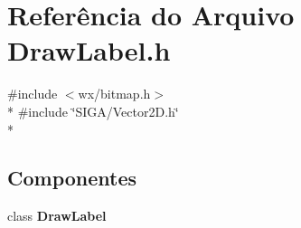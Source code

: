 \section{Referência do Arquivo Draw\+Label.\+h}
\label{_draw_label_8h}
{\ttfamily \#include $<$wx/bitmap.\+h$>$}\\*
{\ttfamily \#include \char`\"{}S\+I\+G\+A/\+Vector2\+D.\+h\char`\"{}}\\*
\subsection*{Componentes}
\begin{DoxyCompactItemize}
\item 
class {\bf Draw\+Label}
\end{DoxyCompactItemize}
